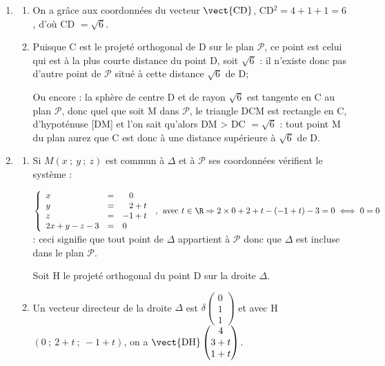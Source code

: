 \begin{enumerate}
\begin{enumerate}
$M(x~;~y~;~z) \in \mathcal{P} \iff 2x + 1y - 1z + d = 0$.

En particulier C$(2~;~-2~;~ -1) \in \mathcal{P} \iff 2\times 2  + 1\times (- 2)  - 1\times (- 1) + d = 0 \iff 4 - 2 + 1 + d = 0 \iff d = - 3$.

Finalement : $M(x~;~y~;~z) \in \mathcal{P} \iff 2x + y - z - 3 = 0$.
	\end{enumerate}
\item 
	\begin{enumerate}
		\item 
On a grâce aux coordonnées du vecteur $\vect{\text{CD}}$, \:CD$^2 = 4 + 1 + 1 = 6$, d'où CD $ = \sqrt 6$.
		\item 
Puisque C est le projeté orthogonal de D sur le plan $\mathcal{P}$, ce point est celui qui est à la plus courte distance du point D, soit $\sqrt 6$ : il n'existe donc pas d'autre point de $\mathcal{P}$ situé à cette distance $\sqrt 6$ de D;

Ou encore : la sphère de centre D et de rayon $\sqrt 6$ est tangente en C au plan $\mathcal{P}$, donc quel que soit M dans $\mathcal{P}$, le triangle DCM est rectangle en C, d'hypoténuse [DM] et l'on sait qu'alors DM > DC $= \sqrt 6$ : tout point M du plan aurez que C est donc à une distance supérieure à $\sqrt 6$ de D.
	\end{enumerate}
\item 
	\begin{enumerate}
		\item 
Si $M(x~;~y~;~z)$ est commun à $\Delta$ et à $\mathcal{P}$ ses coordonnées vérifient le système :

$\left\{\begin{array}{l c l}
x &=&\phantom{-}0\\
y &=&\phantom{-}2 + t\\
z &=& -1 + t\\
2x + y - z - 3 &=& 0
\end{array}\right.\:,\:\: \text{avec } t\in \R \Rightarrow 2 \times 0  + 2 + t  - (- 1 + t) - 3 = 0 \iff 0 = 0$ : ceci signifie que tout point de $\Delta$ appartient à $\mathcal{P}$ donc que $\Delta$ est incluse dans le plan $\mathcal{P}$.

Soit H le projeté orthogonal du point D sur la droite $\Delta$.
		\item 
Un vecteur directeur de la droite $\Delta$ est $\delta\begin{pmatrix}0\\1\\1\end{pmatrix}$ et avec H$(0~;~2 + t~;~- 1 + t)$, on a $\vect{\text{DH}}\begin{pmatrix}4\\3 + t\\1 + t\end{pmatrix}$.


\end{enumerate}
\end{enumerate}
